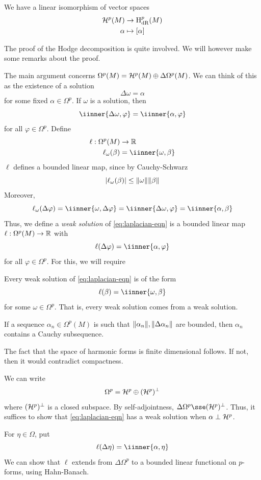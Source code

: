 \documentclass{article}
\begin{document}
\begin{corollary}
    We have a linear isomorphism of vector spaces
    \begin{align*}
        \mathcal{H}^p(M) &\to \mathrm{H}_\mathrm{dR}^p(M) \\
        \alpha & \mapsto [\alpha]
    \end{align*}
\end{corollary}

The proof of the Hodge decomposition is quite involved. We will however make some remarks about the proof.

The main argument concerns \(\Omega^p(M) = \mathcal{H}^p(M) \oplus \Delta\Omega^p(M)\). We can think of this as the existence of a solution
\begin{equation}
    \label{eq:laplacian-eqn}
    \Delta\omega = \alpha
\end{equation}
for some fixed \(\alpha \in \Omega^p\). If \(\omega\) is a solution, then
\[\iinner{\Delta\omega, \varphi} = \iinner{\alpha, \varphi}\]
for all \(\varphi \in \Omega^p\). Define
\begin{align*}
    \ell : \Omega^p(M) &\to \R \\
    \ell_\omega(\beta) &= \iinner{\omega, \beta}
\end{align*}
\(\ell\) defines a bounded linear map, since by Cauchy-Schwarz
\[\abs{\ell_\omega(\beta)} \le \norm{\omega}\norm{\beta}\]
Moreover,
\[\ell_\omega(\Delta\varphi) = \iinner{\omega, \Delta\varphi} = \iinner{\Delta\omega, \varphi} = \iinner{\alpha, \beta}\]
Thus, we define a \emph{weak solution} of \cref{eq:laplacian-eqn} is a bounded linear map \(\ell : \Omega^p(M) \to \mathbb{R}\) with
\[\ell(\Delta\varphi) = \iinner{\alpha, \varphi}\]
for all \(\varphi \in \Omega^p\). For this, we will require
\begin{theorem}
     Every weak solution of \cref{eq:laplacian-eqn} is of the form
    \[\ell(\beta) = \iinner{\omega, \beta}\]
    for some \(\omega \in \Omega^p\). That is, every weak solution comes from a weak solution.
\end{theorem}

\begin{theorem}
    [compactness] If a sequence \(\alpha_n \in \Omega^p(M)\) is such that \(\norm{\alpha_n}, \norm{\Delta\alpha_n}\) are bounded, then \(\alpha_n\) contains a Cauchy subsequence.
\end{theorem}

The fact that the space of harmonic forms is finite dimensional follows. If not, then it would contradict compactness.

We can write
\[\Omega^p = \mathcal{H}^p \oplus (\mathcal{H}^p)^\perp\]
where \((\mathcal{H}^p)^\perp\) is a closed subspace. By self-adjointness, \(\Delta\Omega^p \sse (\mcH^p)^\perp\). Thus, it suffices to show that \cref{eq:laplacian-eqn} has a weak solution when \(\alpha \perp \mathcal{H}^p\).

For \(\eta \in \Omega\), put
\[\ell(\Delta\eta) = \iinner{\alpha, \eta}\]
We can show that \(\ell\) extends from \(\Delta\Omega^p\) to a bounded linear functional on \(p\)-forms, using Hahn-Banach.

\printindex
\end{document}
